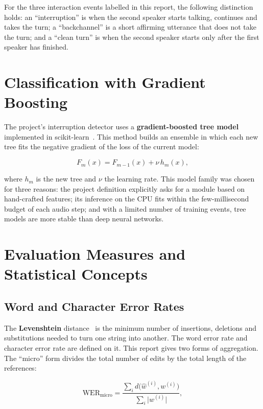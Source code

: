 For the three interaction events labelled in this report, the following
distinction holds: an ``interruption'' is when the second speaker starts talking,
continues and takes the turn; a ``backchannel'' is a short affirming utterance that
does not take the turn; and a ``clean turn'' is when the second speaker starts only
after the first speaker has finished.

\section{Classification with Gradient Boosting}
\label{sec:gbdt}

The project's interruption detector uses a \textbf{gradient-boosted tree
model}~\cite{friedman2001gbm} implemented in
scikit-learn~\cite{pedregosa2011sklearn}. This method builds an ensemble in which
each new tree fits the negative gradient of the loss of the current model:

\begin{equation}
F_m(x) = F_{m-1}(x) + \nu \, h_m(x),
\label{eq:gbm}
\end{equation}

where $h_m$ is the new tree and $\nu$ the learning rate. This model family was
chosen for three reasons: the project definition explicitly asks for a module based
on hand-crafted features; its inference on the CPU fits within the few-millisecond
budget of each audio step; and with a limited number of training events, tree models
are more stable than deep neural networks.

\section{Evaluation Measures and Statistical Concepts}
\label{sec:metrics-prelim}

\subsection{Word and Character Error Rates}

The \textbf{Levenshtein} distance~\cite{levenshtein1966} is the minimum number of
insertions, deletions and substitutions needed to turn one string into another. The
word error rate and character error rate are defined on it. This report gives two
forms of aggregation. The ``micro'' form divides the total number of edits by the
total length of the references:

\begin{equation}
\mathrm{WER}_{\text{micro}} =
\frac{\sum_{i} d\bigl(\hat{w}^{(i)}, w^{(i)}\bigr)}{\sum_{i} \bigl|w^{(i)}\bigr|},
\label{eq:wer}
\end{equation}

